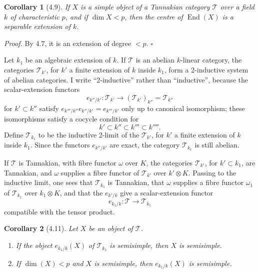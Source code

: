 \documentclass[10pt]{article}
\newcommand{\End}{\operatorname{End}}
\newcommand{\T}{\mathcal T}
\theoremstyle{deligne}
\newtheorem*{corollary*}{Corollary}
\newenvironment{proofdel}{\textit{Proof.}}{\hfill$\square$}
\newcommand{\heading}[1]{\vspace{0.7em}\noindent{\bfseries #1}\quad}
\begin{document}
\begin{corollary*}[4.9]
If \(X\) is a simple object of a Tannakian category \(\T\) over a field \(k\) of characteristic \(p\), and if \(\dim X<p\), then the centre of \(\End(X)\) is a separable extension of \(k\).
\end{corollary*}

\begin{proofdel}
By 4.7, it is an extension of degree \(<p\).
\end{proofdel}

\heading{4.10.}
Let \(k_1\) be an algebraic extension of \(k\). If \(\T\) is an abelian \(k\)-linear category, the categories \(\T_{k'}\), for \(k'\) a finite extension of \(k\) inside \(k_1\), form a 2-inductive system of abelian categories. I write ``2-inductive'' rather than ``inductive'', because the scalar-extension functors
\[
e_{k''/k'}:\T_{k'}\longrightarrow (\T_{k'})_{k''}=\T_{k''}
\]
for \(k'\subset k''\) satisfy \(e_{k'''/k''}e_{k''/k'}=e_{k'''/k'}\) only up to canonical isomorphism; these isomorphisms satisfy a cocycle condition for
\[
k'\subset k''\subset k'''\subset k''''.
\]
Define \(\T_{k_1}\) to be the inductive 2-limit of the \(\T_{k'}\), for \(k'\) a finite extension of \(k\) inside \(k_1\). Since the functors \(e_{k''/k'}\) are exact, the category \(\T_{k_1}\) is still abelian.

If \(\T\) is Tannakian, with fibre functor \(\omega\) over \(K\), the categories \(\T_{k'}\), for \(k'\subset k_1\), are Tannakian, and \(\omega\) supplies a fibre functor of \(\T_{k'}\) over \(k'\otimes K\). Passing to the inductive limit, one sees that \(\T_{k_1}\) is Tannakian, that \(\omega\) supplies a fibre functor \(\omega_1\) of \(\T_{k_1}\) over \(k_1\otimes K\), and that the \(e_{k'/k}\) give a scalar-extension functor
\[
e_{k_1/k}:\T\longrightarrow \T_{k_1}
\]
compatible with the tensor product.

\begin{corollary*}[4.11]
Let \(X\) be an object of \(\T\).
\begin{enumerate}[label=(\roman*)]
\item If the object \(e_{k_1/k}(X)\) of \(\T_{k_1}\) is semisimple, then \(X\) is semisimple.
\item If \(\dim(X)<p\) and \(X\) is semisimple, then \(e_{k_1/k}(X)\) is semisimple.
\end{enumerate}
\end{corollary*}
\end{document}
